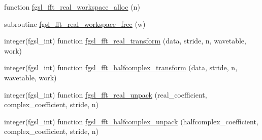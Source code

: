 \begin{DoxyCompactItemize}
function \hyperlink{fft_8finc_adbcc56de7ecc248fc58056203f453b5f}{fgsl\-\_\-fft\-\_\-real\-\_\-workspace\-\_\-alloc} (n)
\item 
subroutine \hyperlink{fft_8finc_a70c81dda8b45ee196cb1b6e60416e71c}{fgsl\-\_\-fft\-\_\-real\-\_\-workspace\-\_\-free} (w)
\item 
integer(fgsl\-\_\-int) function \hyperlink{fft_8finc_a85bb82277112471d93ff981547ca5f85}{fgsl\-\_\-fft\-\_\-real\-\_\-transform} (data, stride, n, wavetable, work)
\item 
integer(fgsl\-\_\-int) function \hyperlink{fft_8finc_ac7b50d9cadbbbcb90263686390ef2bc7}{fgsl\-\_\-fft\-\_\-halfcomplex\-\_\-transform} (data, stride, n, wavetable, work)
\item 
integer(fgsl\-\_\-int) function \hyperlink{fft_8finc_a26adedfb325d69561a2d1261f377c652}{fgsl\-\_\-fft\-\_\-real\-\_\-unpack} (real\-\_\-coefficient, complex\-\_\-coefficient, stride, n)
\item 
integer(fgsl\-\_\-int) function \hyperlink{fft_8finc_a31d71847a61aa5b87c60b8498494358f}{fgsl\-\_\-fft\-\_\-halfcomplex\-\_\-unpack} (halfcomplex\-\_\-coefficient, complex\-\_\-coefficient, stride, n)
\end{DoxyCompactItemize}


